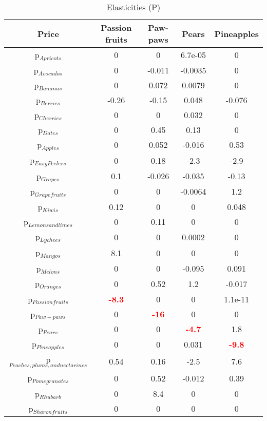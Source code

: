 \documentclass[11pt]{article}
\begin{document}
\begin{table}[h]
\caption{Elasticities (P)}
\label{Table: elasticities 5}
\begin{center}
\begin{tabular}{ccccc}
Price & Passion fruits & Paw-paws & Pears & Pineapples \\ \hline
p$_{Apricots}$ & 0 & 0 & 6.7e-05 & 0 \\ 
p$_{Avocados}$ & 0 & -0.011 & -0.0035 & 0 \\ 
p$_{Bananas}$ & 0 & 0.072 & 0.0079 & 0 \\ 
p$_{Berries}$ & -0.26 & -0.15 & 0.048 & -0.076 \\ 
p$_{Cherries}$ & 0 & 0 & 0.032 & 0 \\ 
p$_{Dates}$ & 0 & 0.45 & 0.13 & 0 \\ 
p$_{Apples}$ & 0 & 0.052 & -0.016 & 0.53 \\ 
p$_{Easy Peelers}$ & 0 & 0.18 & -2.3 & -2.9 \\ 
p$_{Grapes}$ & 0.1 & -0.026 & -0.035 & -0.13 \\ 
p$_{Grapefruits}$ & 0 & 0 & -0.0064 & 1.2 \\ 
p$_{Kiwis}$ & 0.12 & 0 & 0 & 0.048 \\ 
p$_{Lemons and limes}$ & 0 & 0.11 & 0 & 0 \\ 
p$_{Lychees}$ & 0 & 0 & 0.0002 & 0 \\ 
p$_{Mangos}$ & 8.1 & 0 & 0 & 0 \\ 
p$_{Melons}$ & 0 & 0 & -0.095 & 0.091 \\ 
p$_{Oranges}$ & 0 & 0.52 & 1.2 & -0.017 \\ 
p$_{Passion fruits}$ & \textcolor{red}{\textbf{-8.3}} & 0 & 0 & 1.1e-11 \\ 
p$_{Paw-paws}$ & 0 & \textcolor{red}{\textbf{-16}} & 0 & 0 \\ 
p$_{Pears}$ & 0 & 0 & \textcolor{red}{\textbf{-4.7}} & 1.8 \\ 
p$_{Pineapples}$ & 0 & 0 & 0.031 & \textcolor{red}{\textbf{-9.8}} \\ 
p$_{Peaches, plums, and nectarines}$ & 0.54 & 0.16 & -2.5 & 7.6 \\ 
p$_{Pomegranates}$ & 0 & 0.52 & -0.012 & 0.39 \\ 
p$_{Rhubarb}$ & 0 & 8.4 & 0 & 0 \\ 
p$_{Sharon fruits}$ & 0 & 0 & 0 & 0 \\ 
\end{tabular}
\end{center}
\end{table}
\end{document}
